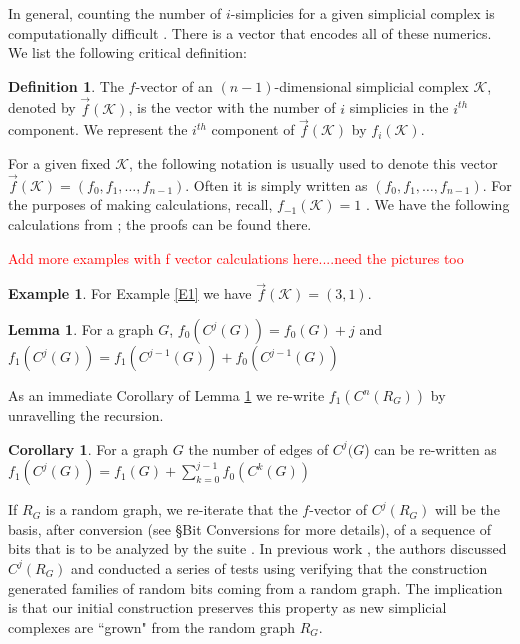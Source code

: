 \documentclass[oneside,12pt]{amsart}
\theoremstyle{definition}
\newtheorem{Definition}[Theorem]{Definition}
\newtheorem{Lemma}[Theorem]{Lemma}
\newtheorem{Corollary}[Theorem]{Corollary}
\newtheorem{Example}[Theorem]{Example}
\numberwithin{equation}{section}
\begin{document}
In general, counting the number of $i$-simplicies for a given simplicial complex is computationally difficult \cite{KP}.  There is a vector that encodes all of these numerics.  We list the following critical definition:

\begin{Definition}\label{fvector}
The $f$-vector of an $(n-1)$-dimensional simplicial complex $\mathcal{K}$, denoted by $\overrightarrow{f}(\mathcal{K})$, is the vector with the number of $i$ simplicies in the $i^{th}$ component. We represent the $i^{th}$ component of $\overrightarrow{f}(\mathcal{K})$ by $f_{i}(\mathcal{K})$.
\end{Definition}

For a given fixed $\mathcal{K}$, the following notation is usually used to denote this vector $\overrightarrow{f}(\mathcal{K}) = (f_0,f_1,\ldots,f_{n-1})$. Often it is simply written as $(f_0,f_1,\ldots,f_{n-1})$. For the purposes of making calculations, recall, $f_{-1}(\mathcal{K}) = 1$ \cite{BP1}.  We have the following calculations from \cite{ALDH}; the proofs can be found there.

\textcolor{red}{Add more examples with f vector calculations here....need the pictures too}
\begin{Example}
For Example \ref{E1} we have $\overrightarrow{f}(\mathcal{K})=(3,1)$.
\end{Example}

\begin{Lemma} \label{Count on Cone}
For a graph $G$, $f_0(C^j(G)) = f_0(G) + j$ and $f_1(C^j(G)) =  f_1(C^{j-1}(G)) +  f_0(C^{j-1}(G))$
\end{Lemma}

As an immediate Corollary of Lemma \ref{Count on Cone} we re-write $f_1(C^n(R_G))$ by unravelling the recursion.

\begin{Corollary}\label{recursion}
For a graph $G$ the number of edges of $C^j(G$) can be re-written as $f_1(C^j(G)) = f_1(G) + \sum_{k = 0}^ {j-1} f_0(C^k(G))$
\end{Corollary}

If $R_G$ is a random graph, we re-iterate that the $f$-vector of $C^j(R_G)$ will be the basis, after conversion (see \S Bit Conversions for more details), of  a sequence of bits that is to be analyzed by the suite \cite{NIST}.  In previous work \cite{ALDH}, the authors discussed $C^j(R_G)$ and conducted a series of tests using \cite{NIST} verifying that the construction generated families of random bits coming from a random graph.  The implication is that our initial construction preserves this property as new simplicial complexes are ``grown" from the random graph $R_G$.
\end{document}
